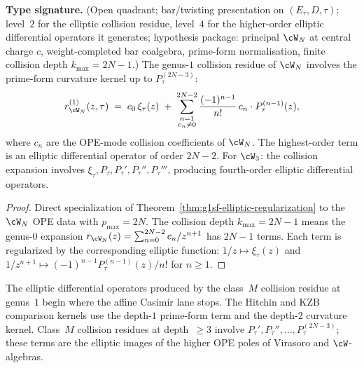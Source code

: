 \begin{theorem}
\label{thm:g1sf-wn}
\textbf{Type signature.} (Open quadrant; bar/twisting presentation on
$(E_\tau, D, \tau)$; level~$2$ for the elliptic collision residue,
level~$4$ for the higher-order elliptic differential operators it
generates; hypothesis package: principal $\cW_N$ at central charge $c$,
weight-completed bar coalgebra, prime-form normalisation,
finite collision depth $k_{\max} = 2N{-}1$.)
The genus-$1$ collision residue of $\cW_N$ involves the prime-form
curvature kernel up to $P_\tau^{(2N-3)}$:
\begin{equation}\label{eq:g1sf-wn-genus1}
r_{\cW_N}^{(1)}(z, \tau)
\;=\;
c_0\, \xi_\tau(z)
\;+\;
\sum_{\substack{n = 1 \\ c_n \neq 0}}^{2N-2}
\frac{(-1)^{n-1}}{n!}\,
c_n \cdot P_\tau^{(n-1)}(z),
\end{equation}
where $c_n$ are the OPE-mode collision coefficients of $\cW_N$. The
highest-order term is an elliptic differential operator of order
$2N - 2$. For $\cW_3$: the collision expansion involves
$\xi_\tau, P_\tau, P_\tau', P_\tau'', P_\tau'''$, producing fourth-order
elliptic differential operators.
\end{theorem}

\begin{proof}
Direct specialization of
Theorem~\ref{thm:g1sf-elliptic-regularization} to the $\cW_N$ OPE
data with $p_{\max} = 2N$. The collision depth $k_{\max} = 2N - 1$
means the genus-$0$ expansion
$r_{\cW_N}(z) = \sum_{n=0}^{2N-2} c_n/z^{n+1}$ has $2N - 1$ terms.
Each term is regularized by the corresponding elliptic function:
$1/z \mapsto \xi_\tau(z)$ and
$1/z^{n+1} \mapsto (-1)^{n-1}P_\tau^{(n-1)}(z)/n!$ for $n \geq 1$.
\end{proof}

\begin{remark}
\label{rem:g1sf-higher-order-operators}
The elliptic differential operators produced by the class~$M$
collision residue at genus~$1$ begin where the affine Casimir lane
stops. The Hitchin and KZB comparison kernels use the depth-$1$
prime-form term and the depth-$2$ curvature kernel. Class~$M$
collision residues at depth~$\geq3$ involve
$P_\tau',P_\tau'',\ldots,P_\tau^{(2N-3)}$; these terms are the elliptic
images of the higher OPE poles of Virasoro and $\cW$-algebras.
\end{remark}

